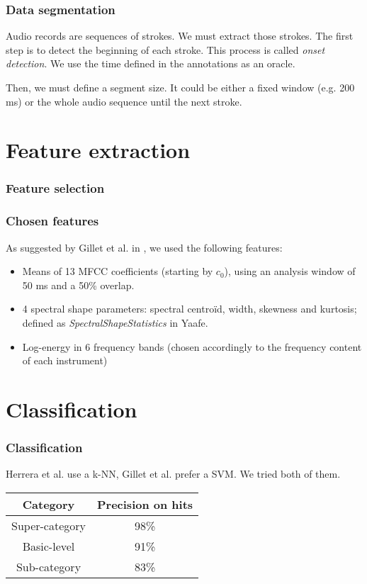 \documentclass{beamer}
\begin{document}
    \begin{frame}
        \frametitle{Data segmentation}
        Audio records are sequences of strokes. We must extract those strokes. The first step is to detect the beginning of each stroke.
        This process is called \emph{onset detection}. We use the time defined in the annotations as an oracle.
        \vspace*{0.5cm}
        
        Then, we must define a segment size. It could be either a fixed window (e.g. 200 ms) or the whole audio sequence until the next stroke.
    \end{frame}
    \section{Feature extraction}
    \begin{frame}
        \frametitle{Feature selection}
    \end{frame}
    \begin{frame}
        \frametitle{Chosen features}
        As suggested by Gillet et al. in \cite{Gillet04}, we used the following features:
        \begin{itemize}
            \item Means of 13 MFCC coefficients (starting by $c_0$), using an analysis window of 50 ms and a 50\% overlap.
            \item 4 spectral shape parameters: spectral centroïd, width, skewness and kurtosis; defined as \emph{SpectralShapeStatistics} in Yaafe.
            \item Log-energy in 6 frequency bands (chosen accordingly to the frequency content of each instrument)
        \end{itemize}

    \end{frame}
    \section{Classification}
    \begin{frame}
        \frametitle{Classification}
        Herrera et al. use a k-NN, Gillet et al. prefer a SVM. We tried both of them.
        \begin{center}
        \begin{tabular}{|c|c|}
            \hline
            Category&Precision on hits\\
            \hline
            Super-category&98\%\\
            \hline
            Basic-level&91\%\\
            \hline
            Sub-category&83\%\\
            \hline
        \end{tabular}
        \end{center}
    \end{frame}
\end{document}
